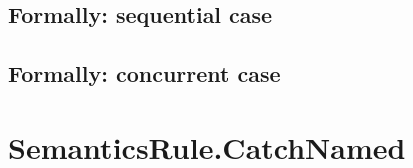 \documentclass{book}
\begin{document}
\begin{emptyformal}
  \subsection{Formally: sequential case}

  \subsection{Formally: concurrent case}
\end{emptyformal}


\section{SemanticsRule.CatchNamed \label{sec:SemanticsRule.CatchNamed}}
\end{document}
